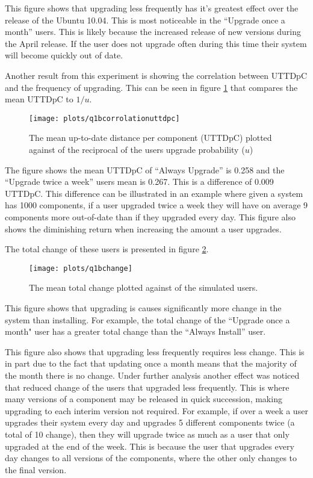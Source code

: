 This figure shows that upgrading less frequently has it's greatest effect over the release of the Ubuntu 10.04.
This is most noticeable in the ``Upgrade once a month'' users.
This is likely because the increased release of new versions during the April release.
If the user does not upgrade often during this time their system will become quickly out of date.

Another result from this experiment is showing the correlation between UTTDpC and the frequency of upgrading.
This can be seen in figure \ref{exp.q1bcorrolationuttdpc} that compares the mean UTTDpC to $1/u$.

\begin{figure}[htp]
\begin{center}
  \texttt{[image: plots/q1bcorrolationuttdpc]}
  \caption{The mean up-to-date distance per component (UTTDpC) plotted against of the reciprocal of the users upgrade probability ($u$)}
  \label{exp.q1bcorrolationuttdpc}
\end{center}
\end{figure}

The figure shows the mean UTTDpC of ``Always Upgrade'' is 0.258 and the ``Upgrade twice a week'' users mean is 0.267.
This is a difference of 0.009 UTTDpC.
This difference can be illustrated in an example where given a system has 1000 components, 
if a user upgraded twice a week they will have on average 9 components more out-of-date than if they upgraded every day. 
This figure also shows the diminishing return when increasing the amount a user upgrades.

The total change of these users is presented in figure \ref{exp.q1bchange}.

\begin{figure}[htp]
\begin{center}
  \texttt{[image: plots/q1bchange]}
  \caption{The mean total change plotted against of the simulated users.}
  \label{exp.q1bchange}
\end{center}
\end{figure}

This figure shows that upgrading is causes significantly more change in the system than installing.
For example, the total change of the ``Upgrade once a month" user has a greater total change than the ``Always Install'' user.

This figure also shows that upgrading less frequently requires less change. 
This is in part due to the fact that updating once a month means that the majority of the month there is no change.
Under further analysis another effect was noticed that reduced change of the users that upgraded less frequently.
This is where many versions of a component may be released in quick succession, making upgrading to each interim version not required.
For example, if over a week a user upgrades their system every day and upgrades 5 different components twice (a total of 10 change), 
then they will upgrade twice as much as a user that only upgraded at the end of the week.
This is because the user that upgrades every day changes to all versions of the components, where the other only changes to the final version.

